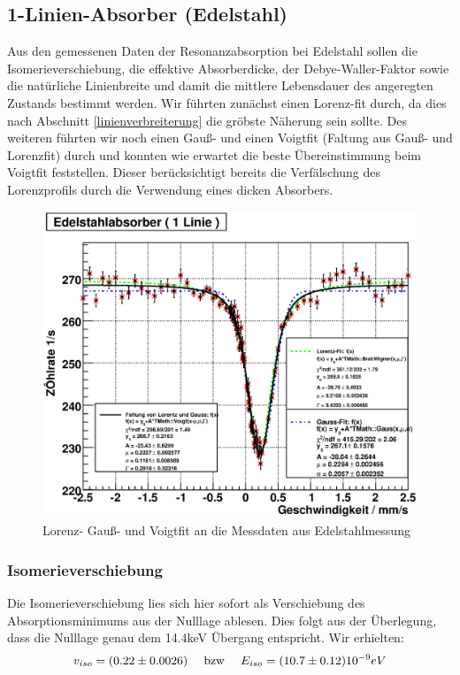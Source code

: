 \documentclass[12pt]{article}
\begin{document}
\subsection{1-Linien-Absorber (Edelstahl)}
Aus den gemessenen Daten der Resonanzabsorption bei Edelstahl sollen die Isomerieverschiebung, die effektive Absorberdicke, der Debye-Waller-Faktor
sowie die natürliche Linienbreite und damit die mittlere Lebensdauer des angeregten Zustands bestimmt werden. Wir führten zunächst einen Lorenz-fit
durch, da dies nach Abschnitt \ref{linienverbreiterung} die gröbste Näherung sein sollte. Des weiteren führten wir noch einen Gauß- und einen Voigtfit
(Faltung aus Gauß- und Lorenzfit) durch und konnten wie erwartet die beste Übereinstimmung beim Voigtfit feststellen. Dieser berücksichtigt bereits 
die Verfälschung des Lorenzprofils durch die Verwendung eines dicken Absorbers.
\begin{figure}[H]
 \includegraphics[width=0.9\linewidth]{pictures/stahl.eps}
 \caption{Lorenz- Gauß- und Voigtfit an die Messdaten aus Edelstahlmessung}
\end{figure}

\subsubsection{Isomerieverschiebung}
Die Isomerieverschiebung lies sich hier sofort als Verschiebung des Absorptionsminimums aus der Nulllage ablesen. Dies folgt aus der Überlegung, dass 
die Nulllage genau dem 14.4keV Übergang entspricht. Wir erhielten:
\begin{align*}
 v_{iso} = (0.22\pm 0.0026) \hspace{10pt} \textnormal{ bzw } \hspace{10pt} E_{iso} = (10.7 \pm 0.12) 10^{-9} eV
\end{align*}
\end{document}
